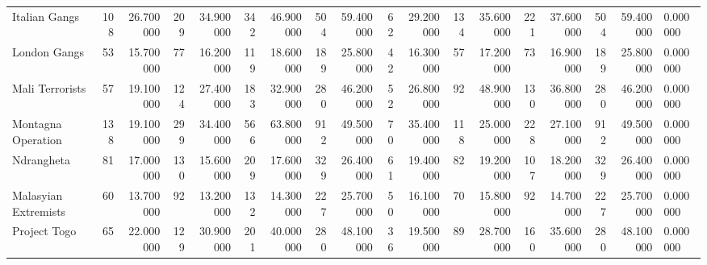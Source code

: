 \begin{tabular}{lrrrrrrrrrrrrrrrrl}
Italian Gangs & 108 & 26.700000 & 209 & 34.900000 & 342 & 46.900000 & 504 & 59.400000 & 62 & 29.200000 & 134 & 35.600000 & 221 & 37.600000 & 504 & 59.400000 & 0.000000 \\
London Gangs & 53 & 15.700000 & 77 & 16.200000 & 119 & 18.600000 & 189 & 25.800000 & 42 & 16.300000 & 57 & 17.200000 & 73 & 16.900000 & 189 & 25.800000 & 0.000000 \\
Mali Terrorists & 57 & 19.100000 & 124 & 27.400000 & 183 & 32.900000 & 280 & 46.200000 & 52 & 26.800000 & 92 & 48.900000 & 130 & 36.800000 & 280 & 46.200000 & 0.000000 \\
Montagna Operation & 138 & 19.100000 & 299 & 34.400000 & 566 & 63.800000 & 912 & 49.500000 & 70 & 35.400000 & 118 & 25.000000 & 228 & 27.100000 & 912 & 49.500000 & 0.000000 \\
Ndrangheta & 81 & 17.000000 & 130 & 15.600000 & 209 & 17.600000 & 329 & 26.400000 & 61 & 19.400000 & 82 & 19.200000 & 107 & 18.200000 & 329 & 26.400000 & 0.000000 \\
Malasyian Extremists & 60 & 13.700000 & 92 & 13.200000 & 132 & 14.300000 & 227 & 25.700000 & 50 & 16.100000 & 70 & 15.800000 & 92 & 14.700000 & 227 & 25.700000 & 0.000000 \\
Project Togo & 65 & 22.000000 & 129 & 30.900000 & 201 & 40.000000 & 280 & 48.100000 & 36 & 19.500000 & 89 & 28.700000 & 160 & 35.600000 & 280 & 48.100000 & 0.000000 \\
\end{tabular}
